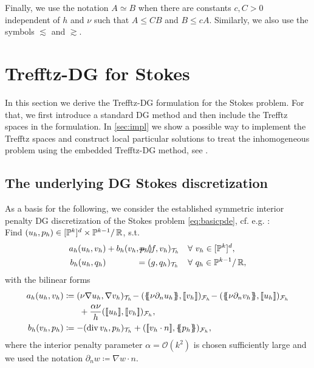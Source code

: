\documentclass[pdflatex,sn-mathphys,Numbered]{sn-jnl}%
\theoremstyle{remark}%
\theoremstyle{definition}%
\begin{document}
Finally, we use the notation $A \simeq B$ when there are constants
$c,C > 0$ independent of $h$ and $\nu$ such that $A \le C B$ and $ B
\le c A$. Similarly, we also use the symbols $\lesssim$ and $\gtrsim$.


\section{Trefftz-DG for Stokes}\label{sec:tdgstokes} In this section
we derive the Trefftz-DG formulation for the Stokes problem. For that,
we first introduce a standard DG method and then include the Trefftz
spaces in the formulation. In \cref{sec:impl} we show a possible way
to implement the Trefftz spaces and construct local particular
solutions to treat the inhomogeneous problem using the embedded
Trefftz-DG method, see \cite{2201.07041}.

\subsection{The underlying DG Stokes discretization} \label{sec:underlyingDG}
As a basis for the following, we consider the established symmetric interior penalty DG discretization of the Stokes problem \eqref{eq:basicpde}, cf. e.g. \cite[Section 6.1.5]{di2011mathematical}: \\
Find $(u_h, p_h) \in [\mathbb{P}^k]^d \times \mathbb{P}^{k-1}/\,\mathbb{R}$, s.t.
\begin{subequations}\label{eq:dgstokes}
\begin{align}
a_h(u_h,v_h) &+ b_h(v_h,p_h) &\hspace*{-1cm}&= (f,v_h)_{\Th} && \forall ~ v_h \in [\PP^k]^d,\\
  b_h(u_h,q_h) &  &\hspace*{-1cm}&= (g,q_h)_{\Th} && \forall ~ q_h \in \PP^{k-1} /\, \RR,
  \end{align}
\end{subequations}
with the bilinear forms
\begin{align*}
  a_h(u_h,v_h) &\coloneqq (\nu\! \Grad\! u_h,\Grad\! v_h)_\Th\! - (\avg{ \nu \partial_n u_h },\jmp{v_h})_\Fh\! - (\avg{\nu \partial_n v_h},\jmp{u_h})_\Fh  \\ & \qquad \!+ \frac{\alpha \nu }{h} (\jmp{u_h},\jmp{v_h})_\Fh, \\ 
b_h(v_h,p_h) &\coloneqq -(\Div v_h, p_h)_{\Th} + (\jmp{v_h \cdot n}, \avg{p_h})_{\Fh},
\end{align*}
where the interior penalty parameter $\alpha = \mathcal{O}(k^2)$ is
chosen sufficiently large and we used the notation $\partial_n w \coloneqq \nabla w \cdot
n$.
\end{document}
